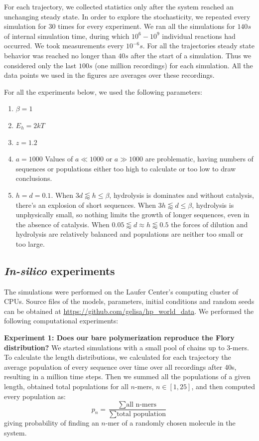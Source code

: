 \documentclass[twocolumn,letterpaper]{revtex4-1}
\begin{document}
For each trajectory, we collected statistics only after the system reached an unchanging steady 
state.  In order 
to explore the stochasticity, we repeated every simulation for 30 times for every experiment. We 
ran all the simulations for $140s$ of internal simulation time, during which $10^6-10^9$ 
individual 
reactions had occurred. We took measurements every $10^{-6}s.$ 
For all the trajectories steady state behavior was reached no longer than $40s$ after the start of 
a simulation. Thus we considered only the last $100s$ (one million recordings) for each 
simulation. 
All the data points we used in the figures are averages over these recordings.


For all the experiments below, we used the following parameters:
\begin{enumerate}
 \item $\beta = 1$
 \item $E_h = 2kT$
 \item $z=1.2$
 
 \item $a=1000$
 \subitem Values of $a\ll 1000\,\,\mbox{or}\,\,a\gg1000$ are problematic, having numbers of 
sequences or populations either too high to calculate or too low to draw conclusions.
 
 \item $h=d=0.1$.
 \subitem When $3d\lessapprox h\leq\beta$, hydrolysis is dominates and without catalysis, there's 
an 
explosion of short sequences. 
\subitem When $3h\lessapprox d\leq\beta$, hydrolysis is unphysically small, so nothing limits the 
growth of longer sequences, even in the absence of catalysis. 
\subitem When $0.05\lessapprox d\approx h \lessapprox 0.5$ the forces of dilution and hydrolysis 
are relatively balanced and populations are neither too small or too large.
 
\end{enumerate}


\subsection*{\textit{In-silico} experiments}\label{sec:experiments}
The simulations were performed on the Laufer Center's computing cluster of CPUs. 
Source files of the models, parameters, initial conditions and random seeds can be obtained at 
\url{https://github.com/gelisa/hp_world_data}.  We performed the following computational 
experiments:


\textbf{Experiment 1: Does our bare polymerization reproduce the Flory 
distribution?}\label{sec:expt1}
We started simulations with a small pool of chains up to 3-mers. To calculate the length 
distributions, 
we calculated for each trajectory the average population of every sequence over time over all 
recordings after 40s, resulting in a million time steps.  Then we summed all the populations of a 
given 
length, obtained total populations for all $n$-mers, $n\in[1,25]$, and then computed every 
population as:
\begin{equation}
 p_n = \frac{\sum\mbox{all n-mers}}{\sum\mbox{total population}}
\end{equation}
giving probability of finding an $n$-mer of a randomly chosen molecule in the system.
\end{document}
